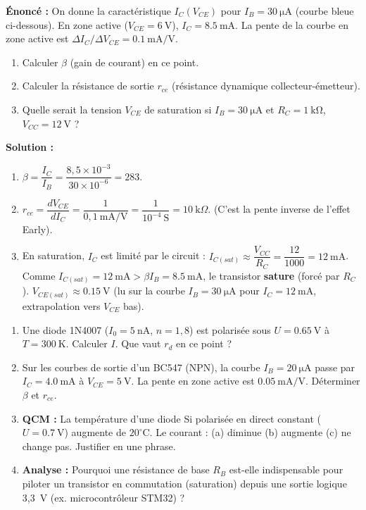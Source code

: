 \documentclass[11pt]{article}
\begin{document}
\begin{exoresolu}
\textbf{Énoncé :} On donne la caractéristique $I_C(V_{CE})$ pour $I_B = \SI{30}{\micro\ampere}$ (courbe bleue ci-dessous). En zone active ($V_{CE}=\SI{6}{\volt}$), $I_C = \SI{8,5}{\milli\ampere}$. La pente de la courbe en zone active est $\Delta I_C / \Delta V_{CE} = \SI{0,1}{\milli\ampere\per\volt}$.
\begin{enumerate}
    \item Calculer $\beta$ (gain de courant) en ce point.
    \item Calculer la résistance de sortie $r_{ce}$ (résistance dynamique collecteur-émetteur).
    \item Quelle serait la tension $V_{CE}$ de saturation si $I_B = \SI{30}{\micro\ampere}$ et $R_C = \SI{1}{\kilo\ohm}$, $V_{CC} = \SI{12}{\volt}$ ?
\end{enumerate}
\textbf{Solution :}
\begin{enumerate}
    \item $\beta = \dfrac{I_C}{I_B} = \dfrac{8,5 \times 10^{-3}}{30 \times 10^{-6}} = \boxed{283}$.
    \item $r_{ce} = \dfrac{dV_{CE}}{dI_C} = \dfrac{1}{0,1~\text{mA/V}} = \dfrac{1}{10^{-4}~\text{S}} = \boxed{10~\text{k}\Omega}$. (C'est la pente inverse de l'effet Early).
    \item En saturation, $I_C$ est limité par le circuit : $I_{C(sat)} \approx \dfrac{V_{CC}}{R_C} = \dfrac{12}{1000} = \SI{12}{\milli\ampere}$. Comme $I_{C(sat)} = \SI{12}{\milli\ampere} > \beta I_B = \SI{8,5}{\milli\ampere}$, le transistor \textbf{sature} (forcé par $R_C$). $V_{CE(sat)} \approx \SI{0,15}{\volt}$ (lu sur la courbe $I_B=\SI{30}{\micro\ampere}$ pour $I_C=\SI{12}{\milli\ampere}$, extrapolation vers $V_{CE}$ bas).
\end{enumerate}
\end{exoresolu}

\begin{exercice}
\begin{enumerate}
    \item Une diode 1N4007 ($I_0 = \SI{5}{\nano\ampere}$, $n=1,8$) est polarisée sous $U = \SI{0,65}{\volt}$ à $T=\SI{300}{\kelvin}$. Calculer $I$. Que vaut $r_d$ en ce point ?
    \item Sur les courbes de sortie d'un BC547 (NPN), la courbe $I_B = \SI{20}{\micro\ampere}$ passe par $I_C = \SI{4,0}{\milli\ampere}$ à $V_{CE}=\SI{5}{\volt}$. La pente en zone active est $\SI{0,05}{\milli\ampere\per\volt}$. Déterminer $\beta$ et $r_{ce}$.
    \item \textbf{QCM :} La température d'une diode Si polarisée en direct constant ($U = \SI{0,7}{\volt}$) augmente de $20^\circ$C. Le courant : (a) diminue (b) augmente (c) ne change pas. Justifier en une phrase.
    \item \textbf{Analyse :} Pourquoi une résistance de base $R_B$ est-elle indispensable pour piloter un transistor en commutation (saturation) depuis une sortie logique 3,3~V (ex. microcontrôleur STM32) ?
\end{enumerate}
\end{exercice}
\end{document}

